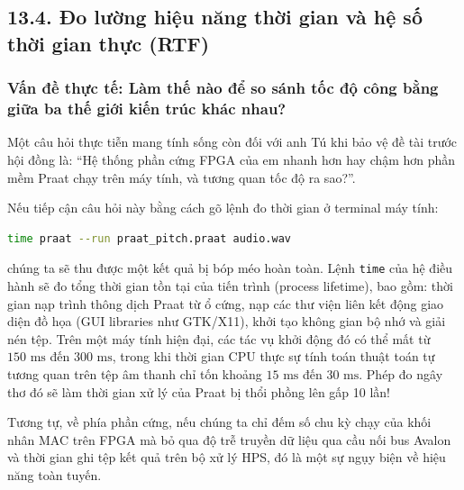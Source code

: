 \subsection*{13.4. Đo lường hiệu năng thời gian và hệ số thời gian thực (RTF)}

\subsubsection*{Vấn đề thực tế: Làm thế nào để so sánh tốc độ công bằng giữa ba thế giới kiến trúc khác nhau?}
Một câu hỏi thực tiễn mang tính sống còn đối với anh Tú khi bảo vệ đề tài trước hội đồng là: ``Hệ thống phần cứng FPGA của em nhanh hơn hay chậm hơn phần mềm Praat chạy trên máy tính, và tương quan tốc độ ra sao?''.

Nếu tiếp cận câu hỏi này bằng cách gõ lệnh đo thời gian ở terminal máy tính:
\begin{lstlisting}[language=bash]
time praat --run praat_pitch.praat audio.wav
\end{lstlisting}
chúng ta sẽ thu được một kết quả bị bóp méo hoàn toàn. Lệnh \texttt{time} của hệ điều hành sẽ đo tổng thời gian tồn tại của tiến trình (process lifetime), bao gồm: thời gian nạp trình thông dịch Praat từ ổ cứng, nạp các thư viện liên kết động giao diện đồ họa (GUI libraries như GTK/X11), khởi tạo không gian bộ nhớ và giải nén tệp. Trên một máy tính hiện đại, các tác vụ khởi động đó có thể mất từ $150\text{ ms}$ đến $300\text{ ms}$, trong khi thời gian CPU thực sự tính toán thuật toán tự tương quan trên tệp âm thanh chỉ tốn khoảng $15\text{ ms}$ đến $30\text{ ms}$. Phép đo ngây thơ đó sẽ làm thời gian xử lý của Praat bị thổi phồng lên gấp 10 lần!

Tương tự, về phía phần cứng, nếu chúng ta chỉ đếm số chu kỳ chạy của khối nhân MAC trên FPGA mà bỏ qua độ trễ truyền dữ liệu qua cầu nối bus Avalon và thời gian ghi tệp kết quả trên bộ xử lý HPS, đó là một sự ngụy biện về hiệu năng toàn tuyến.

